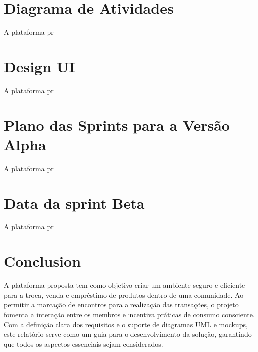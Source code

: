 \documentclass[a4paper, 12pt]{article} %
\begin{document}
\newpage
\section*{Diagrama de Atividades}

A plataforma pr

\newpage
\section*{Design UI}

A plataforma pr

\newpage
\section*{Plano das Sprints para a Versão Alpha }

A plataforma pr

\newpage
\section*{Data da sprint Beta}

A plataforma pr

\newpage
\section*{Conclusion}

A plataforma proposta tem como objetivo criar um ambiente seguro e eficiente para a troca, venda e empréstimo de produtos dentro de uma comunidade. Ao permitir a marcação de encontros para a realização das transações, o projeto fomenta a interação entre os membros e incentiva práticas de consumo consciente. 
Com a definição clara dos requisitos e o suporte de diagramas UML e mockups, este relatório serve como um guia para o desenvolvimento da solução, garantindo que todos os aspectos essenciais sejam considerados.







\end{document}
